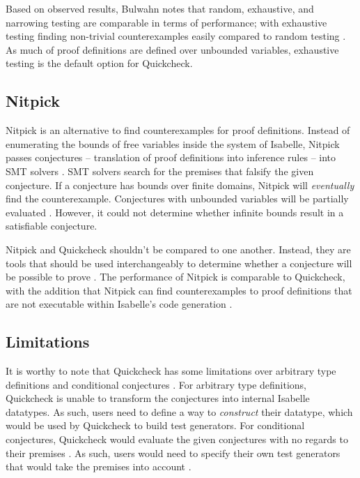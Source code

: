Based on observed results, Bulwahn notes that random, exhaustive, and narrowing testing are comparable in terms of performance; with 
exhaustive testing finding non-trivial counterexamples easily compared to random testing \cite[Sec. 7]{isabelleQuickcheck}. As much of  
proof definitions are defined over unbounded variables, exhaustive testing is the default option for Quickcheck.

\subsection{Nitpick}
\label{sec:Nitpick}

Nitpick is an alternative to find counterexamples for proof definitions. Instead of enumerating the bounds of free variables inside the 
system of Isabelle, Nitpick passes conjectures -- translation of proof definitions into inference rules -- into SMT solvers 
\cite[Sec. 5]{isabelleProof}. SMT solvers search for the premises that falsify the given conjecture. If a conjecture 
has bounds over finite domains, Nitpick will \emph{eventually} find the counterexample. Conjectures with unbounded variables will be partially 
evaluated \cite[Sec. 5.2]{isabelleProof}. However, it could not determine whether infinite bounds result in a satisfiable conjecture.

Nitpick and Quickcheck shouldn't be compared to one another. Instead, they are tools that should be used interchangeably to determine 
whether a conjecture will be possible to prove \cite{isabelleQuickcheck}. The performance of Nitpick is comparable to Quickcheck, with 
the addition that Nitpick can find counterexamples to proof definitions that are not executable within Isabelle's code generation 
\cite[Sec. 7]{isabelleQuickcheck}.

\subsection{Limitations}
\label{sec:IsabelleLimitations}

It is worthy to note that Quickcheck has some limitations over arbitrary type definitions \cite[Sec. 3.1]{isabelleQuickcheck} 
and conditional conjectures \cite[Sec. 4]{isabelleQuickcheck}. For arbitrary type definitions, Quickcheck is unable to transform the conjectures 
into internal Isabelle datatypes. As such, users need to define a way to \emph{construct} their datatype, which would be used by Quickcheck 
to build test generators. For conditional conjectures, Quickcheck would evaluate the given conjectures with no regards to their premises 
\cite[Sec. 4]{isabelleQuickcheck}. As such, users would need to specify their own test generators that would take the premises into account 
\cite[Sec. 4.1]{isabelleQuickcheck}. 

